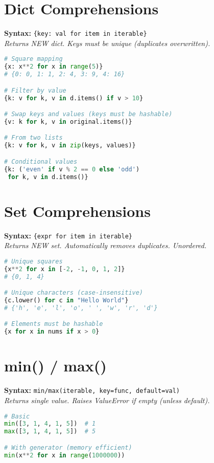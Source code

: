 \documentclass[8pt,landscape]{article}
\begin{document}
\begin{multicols}{3}
\section*{Dict Comprehensions}
\textbf{Syntax:} \lstinline|{key: val for item in iterable}| \\
\textit{Returns NEW dict. Keys must be unique (duplicates overwritten).}

\begin{lstlisting}[language=Python]
# Square mapping
{x: x**2 for x in range(5)}
# {0: 0, 1: 1, 2: 4, 3: 9, 4: 16}

# Filter by value
{k: v for k, v in d.items() if v > 10}

# Swap keys and values (keys must be hashable)
{v: k for k, v in original.items()}

# From two lists
{k: v for k, v in zip(keys, values)}

# Conditional values
{k: ('even' if v % 2 == 0 else 'odd')
 for k, v in d.items()}
\end{lstlisting}

\section*{Set Comprehensions}
\textbf{Syntax:} \lstinline|{expr for item in iterable}| \\
\textit{Returns NEW set. Automatically removes duplicates. Unordered.}

\begin{lstlisting}[language=Python]
# Unique squares
{x**2 for x in [-2, -1, 0, 1, 2]}
# {0, 1, 4}

# Unique characters (case-insensitive)
{c.lower() for c in "Hello World"}
# {'h', 'e', 'l', 'o', ' ', 'w', 'r', 'd'}

# Elements must be hashable
{x for x in nums if x > 0}
\end{lstlisting}

\section*{min() / max()}
\textbf{Syntax:} \lstinline|min/max(iterable, key=func, default=val)| \\
\textit{Returns single value. Raises ValueError if empty (unless default).}

\begin{lstlisting}[language=Python]
# Basic
min([3, 1, 4, 1, 5])  # 1
max([3, 1, 4, 1, 5])  # 5

# With generator (memory efficient)
min(x**2 for x in range(1000000))


\end{lstlisting}
\end{multicols}
\end{document}
